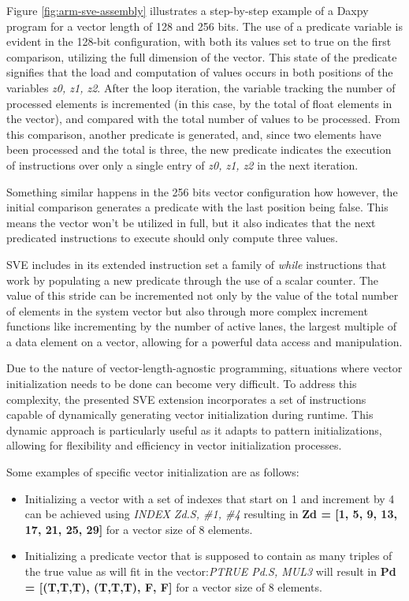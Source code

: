 Figure \ref{fig:arm-sve-assembly} illustrates a step-by-step example of a Daxpy program for a vector length of 128 and 256 bits. The use of a predicate variable is evident in the 128-bit configuration, with both its values set to true on the first comparison, utilizing the full dimension of the vector. This state of the predicate signifies that the load and computation of values occurs in both positions of the variables \textit{z0, z1, z2}. After the loop iteration,  the variable tracking the number of processed elements is incremented (in this case, by the total of float elements in the vector), and compared with the total number of values to be processed. From this comparison, another predicate is generated, and, since two elements have been processed and the total is three, the new predicate indicates the execution of instructions over only a single entry of \textit{z0, z1, z2} in the next iteration.

Something similar happens in the 256 bits vector configuration how however, the initial comparison generates a predicate with the last position being false. This means the vector won't be utilized in full, but it also indicates that the next predicated instructions to execute should only compute three values.

SVE includes in its extended instruction set a family of \textit{while} instructions that work by populating a new predicate through the use of a scalar counter. The value of this stride can be incremented not only by the value of the total number of elements in the system vector but also through more complex increment functions like incrementing by the number of active lanes, the largest multiple of a data element on a vector, allowing for a powerful data access and manipulation. 

Due to the nature of vector-length-agnostic programming, situations where vector initialization needs to be done can become very difficult. To address this complexity, the presented SVE extension incorporates a set of instructions capable of dynamically generating vector initialization during runtime. This dynamic approach is particularly useful as it adapts to pattern initializations, allowing for flexibility and efficiency in vector initialization processes.

Some examples of specific vector initialization are as follows:
\begin{itemize}
    \item Initializing a vector with a set of indexes that start on 1 and increment by 4 can be achieved using \textit{INDEX Zd.S, \#1, \#4} resulting in \textbf{Zd = [1, 5, 9, 13, 17, 21, 25, 29]} for a vector size of 8 elements.
    \item Initializing a predicate vector that is supposed to contain as many triples of the true value as will fit in the vector:\textit{PTRUE Pd.S, MUL3} will result in  \textbf{Pd = [(T,T,T), (T,T,T), F, F]} for a vector size of 8 elements.
\end{itemize}

